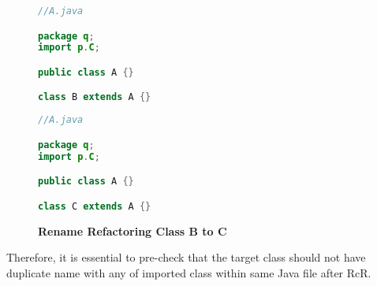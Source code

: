 \begin{figure}[th]
\centering
\begin{minipage}[t]{0.45\linewidth}
\begin{lstlisting}[language=java, basicstyle=\scriptsize\ttfamily,frame=single]	
//A.java

package q;
import p.C;

public class A {}

class B extends A {}

\end{lstlisting}
\end{minipage}
\hfill
\begin{minipage}[t]{0.45\linewidth}
\begin{lstlisting}[language=java, basicstyle=\scriptsize\ttfamily,frame=single]
//A.java

package q;
import p.C;

public class A {}

class C extends A {}

\end{lstlisting}
\end{minipage}
\caption{\textbf{Rename Refactoring Class B to C}}
\label{figure:figpc3_1}
\end{figure}

Therefore, it is essential to pre-check that the target class should not have duplicate name with any of imported class within same Java file after RcR.

